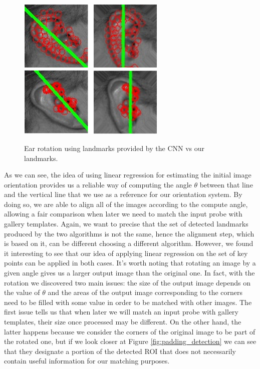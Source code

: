 \documentclass{article}
\begin{document}
\begin{figure}[h]
    \label{fig:rotation}
    \begin{center}
        \includegraphics[width=7cm,keepaspectratio]{images/rotation.png}\\
        \includegraphics[width=7cm,keepaspectratio]{images/rotation2.png}
        \caption{Ear rotation using landmarks provided by the CNN vs our landmarks.}
    \end{center}
\end{figure}

As we can see, the idea of using linear regression for estimating the initial image orientation
provides us a reliable way of computing the angle $\theta$ between that line and the vertical line
that we use as a reference for our orientation system. By doing so, we are able to align all of the
images according to the compute angle, allowing a fair comparison when later we need to match the input
probe with gallery templates. 
Again, we want to precise that the set of detected landmarks produced by the two algorithms
is not the same, hence the alignment step, which is based on it, can be different choosing a
different algorithm. However, we found it interesting to see that our idea of applying linear
regression on the set of key points can be applied in both cases.
It's worth noting that rotating an image by a given angle gives us a larger
output image than the original one. In fact, with the rotation we discovered two main issues: the size
of the output image depends on the value of $\theta$ and the areas of the output image corresponding to
the corners need to be filled with some value in order to be matched with other images. The first issue
tells us that when later we will match an input probe with gallery templates, their size once processed
may be different. On the other hand, the latter happens because we consider the corners of the original
image to be part of the rotated one, but if we look closer at Figure \ref{fig:padding_detection} we can see
that they designate a
portion of the detected ROI that does not necessarily contain useful information for our matching purposes.
\end{document}
